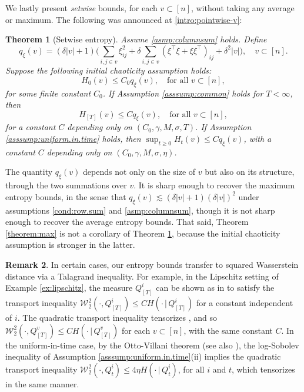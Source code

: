\documentclass[11pt,reqno]{amsart}
\numberwithin{equation}{section}
\newtheorem{theorem}{Theorem}[section]
\theoremstyle{definition}
\newtheorem{remark}[theorem]{Remark}
\def\W{{\mathcal W}}
\begin{document}
We lastly present \emph{setwise} bounds, for each $v \subset [n]$, without taking any average or maximum. The following was announced at \eqref{intro:pointwise-v}:


 

\begin{theorem}[Setwise entropy]  \label{theorem:pointwise}
Assume \eqref{asmp:columnsum} holds. 
Define
	\begin{equation}
		q_{\xi}(v) = (\delta|v|+1)\bigg(\sum_{i,j\in v}\xi^2_{ij} + \delta \sum_{i,j \in v}(\xi^\top \xi+\xi\xi^\top)_{ij}  + \delta^2|v|\bigg), \quad v \subset [n]. \label{eq:q_xi}
	\end{equation}
	Suppose the following initial chaoticity assumption holds:
	\begin{equation}\label{eq:pointwise.init.cond}
		H_{0}(v) \le  C_0 q_{\xi}(v) , \quad \text{for all } v \subset [n],
	\end{equation}
	for some finite constant $C_0$.
If Assumption \ref{asssump:common} holds for $T < \infty$, then 
\begin{equation}\label{eq:pointwise}
H_{[T]}(v) \le Cq_{\xi}(v), \quad \text{for all } v \subset [n],
\end{equation}
for a constant  $C$ depending only on $(C_0, \gamma, M,\sigma, T)$.  If Assumption \ref{asssump:uniform.in.time} holds,  then $\sup_{t \ge 0}H_t(v) \le Cq_{\xi}(v)$, with a constant  $C$ depending only on $(C_0, \gamma, M, \sigma,\eta)$.  
\end{theorem}


The quantity $q_\xi(v)$ depends not only on the size of $v$ but also on its structure, through the two summations over $v$. 
It is sharp enough to recover the maximum entropy bounds, in the sense that $q_\xi(v) \lesssim (\delta|v|+1)(\delta|v|)^2$ under assumptions \eqref{cond:row.sum} and \eqref{asmp:columnsum}, though it is not sharp enough to recover the average entropy bounds. 
That said, Theorem \ref{theorem:max} is not a corollary of Theorem \ref{theorem:pointwise}, because the  initial chaoticity assumption is stronger in the latter.

\begin{remark}
In certain cases, our entropy bounds transfer to  squared  Wasserstein distance via a Talagrand inequality. For example, in the Lipschitz setting of Example \ref{ex:lipschitz}, the measure $Q^i_{[T]}$ can be shown as in \cite{lacker2022hierarchies} to satisfy the transport inequality $\W_2^2(\cdot,Q^i_{[T]}) \le C H(\cdot\,|\,Q^i_{[T]})$ for a constant independent of $i$.
The quadratic transport inequality tensorizes \cite[Proposition 1.9]{gozlan2010transport}, and so  $\W_2^2(\cdot,Q^v_{[T]}) \le C H(\cdot\,|\,Q^v_{[T]})$ for each $v \subset [n]$, with the same constant $C$.
In the uniform-in-time case, by the Otto-Villani  theorem \cite{otto2000generalization} (see also \cite[Theorem 8.12]{gozlan2010transport}), the log-Sobolev inequality of Assumption \ref{asssump:uniform.in.time}(ii) implies the quadratic transport inequality  $\W^2_2(\cdot, Q^i_t) \le 4 \eta H(\cdot \, | \, Q^i_t)$, for all $i$ and $t$, which tensorizes in the same manner.
\end{remark}
\end{document}
